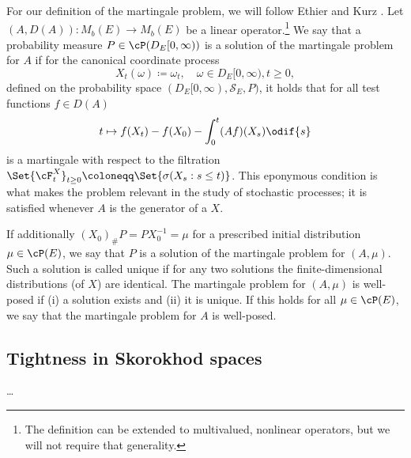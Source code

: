 For our definition of the martingale problem, we will follow Ethier and Kurz \cite[p.174]{ethierMarkovProcessesCharacterization1985}.
Let $(A, D(A)) : M_b(E) \to M_b(E)$ be a linear operator.\footnote{The definition can be extended to multivalued, nonlinear operators, but we will not require that generality.}
We say that a probability measure $P \in \cP(D_E[0,\infty))$ is a solution of the martingale problem for $A$ if for the canonical coordinate process
\begin{equation}
  X_t(\omega) \coloneqq \omega_t, \quad \omega \in D_E[0,\infty), t \geq 0,
\end{equation}
defined on the probability space $(D_E[0,\infty), \mathscr{S}_E, P)$, it holds that for all test functions $f \in D(A)$
\begin{equation}
  t \mapsto f(X_t) - f(X_0) - \int_0^t (Af)(X_s) \odif{s}
\end{equation}
is a martingale with respect to the filtration $\Set{\cF_t^X}_{t\geq0} \coloneqq \Set{\sigma(X_s : s \leq t)}$. %
This eponymous condition is what makes the problem relevant in the study of stochastic processes; it is satisfied whenever $A$ is the generator of a $X$.

If additionally $(X_0)_\# P = P X_0^{-1} = \mu$ for a prescribed initial distribution $\mu \in \cP(E)$, we say that $P$ is a solution of the martingale problem for $(A,\mu)$.
Such a solution is called unique if for any two solutions the finite-dimensional distributions (of $X$) are identical.
The martingale problem for $(A,\mu)$ is well-posed if (i) a solution exists and (ii) it is unique.
If this holds for all $\mu \in \cP(E)$, we say that the martingale problem for $A$ is well-posed.



\subsection{Tightness in Skorokhod spaces}

\dots
